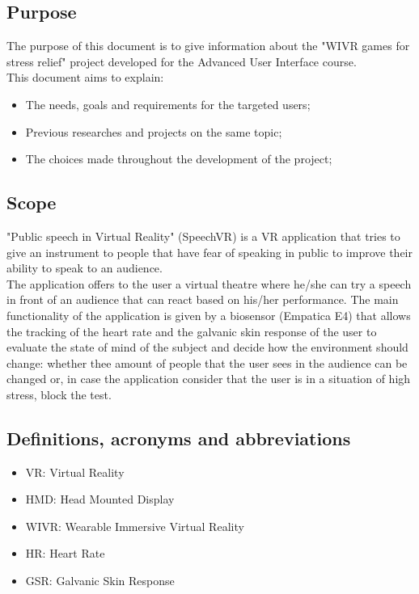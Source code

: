 \subsection{Purpose}
The purpose of this document is to give information about the "WIVR games for stress relief" project developed for the Advanced User Interface course.\\
This document aims to explain:
\begin{itemize}
	\item The needs, goals and requirements for the targeted users;
	\item Previous researches and projects on the same topic;
	\item The choices made throughout the development of the project;
\end{itemize}

\subsection{Scope}
"Public speech in Virtual Reality" (SpeechVR) is a VR application that tries to give an instrument to people that have fear of speaking in public to improve their ability to speak to an audience.\\
The application offers to the user a virtual theatre where he/she can try a speech in front of an audience that can react based on his/her performance. The main functionality of the application is given by a biosensor (Empatica E4) that allows the tracking of the heart rate and the galvanic skin response of the user to evaluate the state of mind of the subject and decide how the environment should change: whether thee amount of people that the user sees in the audience can be changed or, in case the application consider that the user is in a situation of high stress, block the test.
 
\subsection{Definitions, acronyms and abbreviations}
\begin{itemize}
	\item VR: Virtual Reality
	\item HMD: Head Mounted Display
	\item WIVR: Wearable Immersive Virtual Reality
	\item HR: Heart Rate
	\item GSR: Galvanic Skin Response
\end{itemize}
